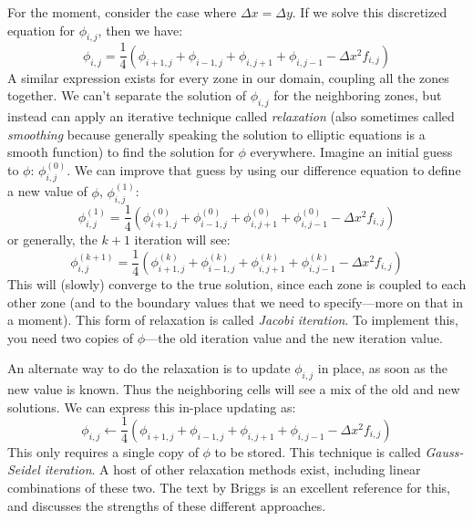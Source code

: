 For the moment, consider the case where $\Delta x = \Delta y$.  If we
solve this discretized equation for $\phi_{i,j}$, then we have:
\begin{equation}
\phi_{i,j} = \frac{1}{4} (\phi_{i+1,j} + \phi_{i-1,j} + 
                          \phi_{i,j+1} + \phi_{i,j-1} - \Delta x^2 f_{i,j} )
\end{equation}
A similar expression exists for every zone in our domain, coupling all
the zones together.  We can't separate the solution of $\phi_{i,j}$
for the neighboring zones, but instead can apply an iterative
technique called {\em relaxation} (also sometimes called {\em
  smoothing} because generally speaking the solution to elliptic
equations is a smooth function) to find the solution for $\phi$
everywhere.  Imagine an initial guess to $\phi$: $\phi_{i,j}^{(0)}$.
We can improve that guess by using our difference equation to define a
new value of $\phi$, $\phi_{i,j}^{(1)}$:
\begin{equation}
\phi_{i,j}^{(1)} = \frac{1}{4} (\phi_{i+1,j}^{(0)} + \phi_{i-1,j}^{(0)} + 
                                \phi_{i,j+1}^{(0)} + \phi_{i,j-1}^{(0)} - 
                                 \Delta x^2 f_{i,j} )
\end{equation}
or generally, the $k+1$ iteration will see:
\begin{equation}
\phi_{i,j}^{(k+1)} = \frac{1}{4} (\phi_{i+1,j}^{(k)} + \phi_{i-1,j}^{(k)} + 
                                  \phi_{i,j+1}^{(k)} + \phi_{i,j-1}^{(k)} - 
                                   \Delta x^2 f_{i,j} )
\end{equation}
This will (slowly) converge to the true solution, since each zone is
coupled to each other zone (and to the boundary values that we need to
specify---more on that in a moment).  This form of relaxation is
called {\em Jacobi iteration}.  To implement this, you need two copies
of $\phi$---the old iteration value and the new iteration value.

An alternate way to do the relaxation is to update $\phi_{i,j}$ in
place, as soon as the new value is known.  Thus the neighboring cells
will see a mix of the old and new solutions.  We can express this in-place
updating as:
\begin{equation}
\phi_{i,j} \leftarrow \frac{1}{4} (\phi_{i+1,j} + \phi_{i-1,j} + 
                                   \phi_{i,j+1} + \phi_{i,j-1} - 
                                   \Delta x^2 f_{i,j} )
\end{equation}
This only requires a single copy of $\phi$ to be stored.  This
technique is called {\em Gauss-Seidel iteration}.  A host of other
relaxation methods exist, including linear combinations of these two.
The text by Briggs is an excellent reference for this, and discusses
the strengths of these different approaches.


